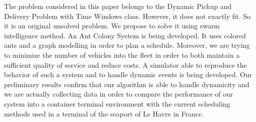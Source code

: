 \documentclass[journal]{IEEEtran}
\begin{document}
The problem considered in this paper belongs to the Dynamic Pickup and Delivery Problem with Time Windows class. However, it does not exactly fit. So it is an original unsolved problem. We propose to solve it using swarm intelligence method. An Ant Colony System is being developed. It uses colored ants and a graph modelling in order to plan a schedule. Moreover, we are trying to minimize the number of vehicles into the fleet in order to both maintain a sufficient quality of service and reduce costs. A simulator able to reproduce the behavior of such a system and to handle dynamic events is being developed. Our preliminary results confirm that our algorithm is able to handle dynamicity and we are actually collecting data in order to compare the performance of our system into a container terminal environment with the current scheduling methods used in a terminal of the seaport of Le Havre in France.
		



\end{document}
